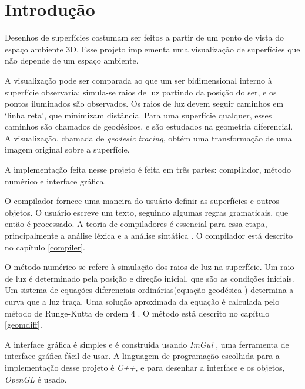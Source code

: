 \chapter{Introdução}
Desenhos de superfícies costumam ser feitos a partir de um ponto de vista do
espaço ambiente 3D.
Esse projeto implementa uma visualização de superfícies que não depende de um espaço ambiente.

A visualização pode ser comparada ao que um ser bidimensional interno à superfície observaria:
simula-se raios de luz partindo da posição do ser, e os pontos iluminados são observados.
Os raios de luz devem seguir caminhos em `linha reta', que minimizam distância.
Para uma superfície qualquer, esses caminhos são chamados de geodésicos,
e são estudados na geometria diferencial.
A visualização, chamada de \textit{geodesic tracing}, obtém uma transformação de uma imagem original sobre a superfície.

A implementação feita nesse projeto é feita em três partes:
compilador, método numérico e interface gráfica.

O compilador fornece uma maneira do usuário definir as superfícies e outros objetos.
O usuário escreve um texto, seguindo algumas regras gramaticais, que então é processado.
A teoria de compiladores é essencial para essa etapa,
principalmente a análise léxica e a análise sintática \cite{Dragon:1}.
O compilador está descrito no capítulo \ref{compiler}.

O método numérico se refere à simulação dos raios de luz na superfície.
Um raio de luz é determinado pela posição e direção inicial, que são as condições iniciais.
Um sistema de equações diferenciais ordinárias(equação geodésica \cite{GeomDiff:1})
determina a curva que a luz traça.
Uma solução aproximada da equação é calculada pelo método de Runge-Kutta de ordem 4 \cite{Anal:1}.
O método está descrito no capítulo \ref{geomdiff}.

A interface gráfica é simples e é construída usando \textit{ImGui} \cite{ImGui},
uma ferramenta de interface gráfica fácil de usar.
A linguagem de programação escolhida para a implementação desse projeto é \textit{C++},
e para desenhar a interface e os objetos, \textit{OpenGL} é usado.
